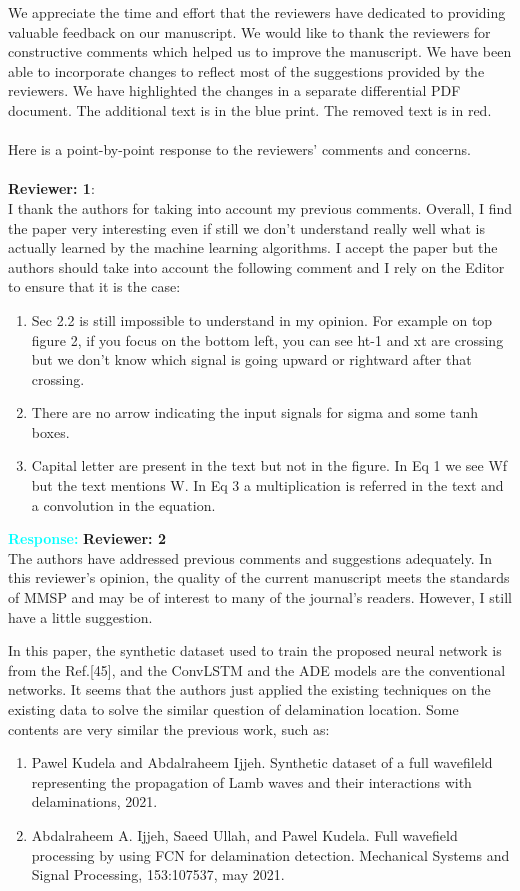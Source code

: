 \documentclass[11pt,a2paper]{report}
\begin{document}
	
	\noindent We appreciate the time and effort that the reviewers have dedicated to providing valuable feedback on our manuscript. 
	We would like to thank the reviewers for constructive comments which helped us to improve the manuscript. 
	We have been able to incorporate changes to reflect most of the suggestions provided by the reviewers. 
	We have highlighted the changes in a separate differential PDF document. The additional text is in the blue print. 
	The removed text is in red. \\ \\
	Here is a point-by-point response to the reviewers’ comments and concerns.
	\\ \\
	\textbf{Reviewer: 1}: \\
	I thank the authors for taking into account my previous comments. 
	Overall, I find the paper very interesting even if still we don't understand really well what is actually learned by the machine learning algorithms. 
	I accept the paper but the authors should take into account the following comment and I rely on the Editor to ensure that it is the case:
	\begin{enumerate}
		\item Sec 2.2 is still impossible to understand in my opinion. 
		For example on top figure 2, if you focus on the bottom left, you can see ht-1 and xt are crossing but we don't know which signal is going upward or rightward after that crossing.
		\item There are no arrow indicating the input signals for sigma and some tanh boxes.
		\item Capital letter are present in the text but not in the figure. 
		In Eq 1 we see Wf but the text mentions W. 
		In Eq 3 a multiplication is referred in the text and a convolution in the equation.		
	\end{enumerate}	
	\textcolor{Cyan}{
	\textbf{Response:}}
	\newpage 
	\textbf{Reviewer: 2}\\
	The authors have addressed previous comments and suggestions adequately. 
	In this reviewer's opinion, the quality of the current manuscript meets the standards of MMSP and may be of interest to many of the journal's readers. However, I still have a little suggestion.
	 
	In this paper, the synthetic dataset used to train the proposed neural network is from the Ref.[45], and the ConvLSTM and the ADE models are the conventional networks. 
	It seems that the authors just applied the existing techniques on the existing data to solve the similar question of delamination location. 
	Some contents are very similar the previous work, such as:
	\begin{enumerate}
		\item Pawel Kudela and Abdalraheem Ijjeh. Synthetic dataset of a full wavefileld representing the propagation of Lamb waves and their interactions with delaminations, 2021. 
		\item Abdalraheem A. Ijjeh, Saeed Ullah, and Pawel Kudela. Full wavefield processing by using FCN for delamination detection. Mechanical Systems and Signal Processing, 153:107537, may 2021.
	\end{enumerate}
\end{document}
